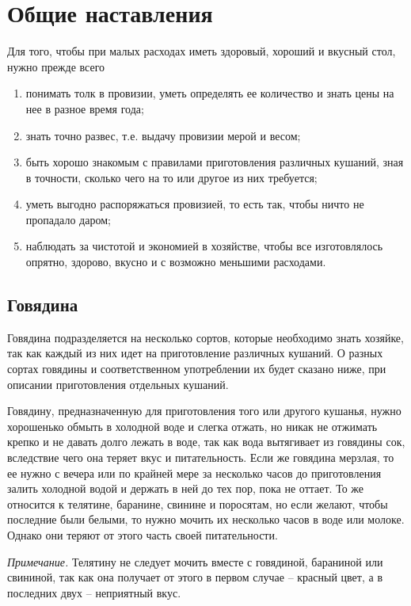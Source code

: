 \section*{Общие наставления} \label{0sec:obsch-nast}

Для того, чтобы при малых расходах иметь здоровый, хороший и вкусный стол, нужно прежде всего

\begin{enumerate}
	\item понимать толк в провизии, уметь определять ее количество и знать цены на нее в разное время года;
	\item знать точно развес, т.е. выдачу провизии мерой и весом;
    \item быть хорошо знакомым с правилами приготовления различных кушаний, зная в точности, сколько чего на то или другое из них требуется;
    \item уметь выгодно распоряжаться провизией, то есть так, чтобы ничто не пропадало даром;
    \item наблюдать за чистотой и экономией в хозяйстве, чтобы все изготовлялось опрятно, здорово, вкусно и с возможно меньшими расходами.
\end{enumerate}

\subsection{Говядина}

Говядина подразделяется на несколько сортов, которые необходимо знать хозяйке, так как каждый из них идет на приготовление различных кушаний. О разных сортах говядины и соответственном употреблении их будет сказано ниже, при описании приготовления отдельных кушаний.

Говядину, предназначенную для приготовления того или другого кушанья, нужно хорошенько обмыть в холодной воде и слегка отжать, но никак не отжимать крепко и не давать долго лежать в воде, так как вода вытягивает из говядины сок, вследствие чего она теряет вкус и питательность. Если же говядина мерзлая, то ее нужно с вечера или по крайней мере за несколько часов до приготовления залить холодной водой и держать в ней до тех пор, пока не оттает. То же относится к телятине, баранине, свинине и поросятам, но если желают, чтобы последние были белыми, то нужно мочить их несколько часов в воде или молоке. Однако они теряют от этого часть своей питательности.

 \emph{Примечание.} Телятину не следует мочить вместе с говядиной, бараниной или свининой, так как она получает от этого в первом случае – красный цвет, а в последних двух – неприятный вкус.

